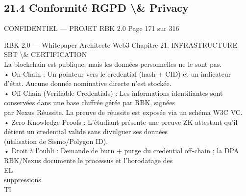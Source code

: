 \subsection{21.4 Conformité RGPD \textbackslash{}& Privacy}
\vspace{0.5em}
\begin{confidential}CONFIDENTIEL — PROJET RBK 2.0                                   Page 171 sur 316\end{confidential}
RBK 2.0 — Whitepaper Architecte Web3                                                Chapitre 21. INFRASTRUCTURE SBT \textbackslash{}& CERTIFICATION\\
\vspace{0.5em}
\vspace{0.5em}
\vspace{0.5em}
La blockchain est publique, mais les données personnelles ne le sont pas.\\
\vspace{0.5em}
• On-Chain : Un pointeur vers le credential (hash + CID) et un indicateur d’état. Aucune donnée nominative directe n’est stockée.\\
\vspace{0.5em}
• Off-Chain (Verifiable Credentials) : Les informations identifiantes sont conservées dans une base chiffrée gérée par RBK, signées\\
par Nexus Réussite. La preuve de réussite est exposée via un schéma W3C VC.\\
\vspace{0.5em}
• Zero-Knowledge Proofs : L’étudiant présente une preuve ZK attestant qu’il détient un credential valide sans divulguer ses données\\
(utilisation de Sismo/Polygon ID).\\
\vspace{0.5em}
• Droit à l’oubli : Demande de burn + purge du credential off-chain ; la DPA RBK/Nexus documente le processus et l’horodatage des\\
\vspace{0.5em}
\vspace{0.5em}
\vspace{0.5em}
\vspace{0.5em}
EL\\
suppressions.\\
\vspace{0.5em}
\vspace{0.5em}
\vspace{0.5em}
\vspace{0.5em}
TI\\
